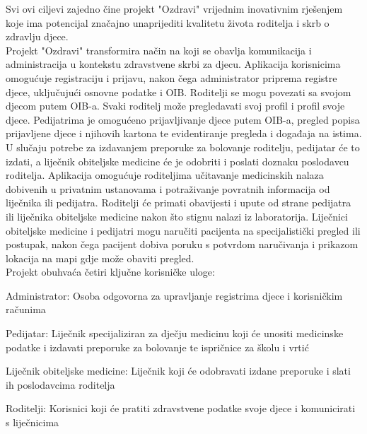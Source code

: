 Svi ovi ciljevi zajedno čine projekt "Ozdravi" vrijednim inovativnim rješenjem koje ima potencijal značajno unaprijediti kvalitetu života roditelja i skrb o zdravlju djece. \\

Projekt "Ozdravi" transformira način na koji se obavlja komunikacija i administracija u kontekstu zdravstvene skrbi za djecu. Aplikacija korisnicima omogućuje registraciju i prijavu, nakon čega administrator priprema registre djece, uključujući osnovne podatke i OIB. Roditelji se mogu povezati sa svojom djecom putem OIB-a. Svaki roditelj može pregledavati svoj profil i profil svoje djece. Pedijatrima je omogućeno prijavljivanje djece putem OIB-a, pregled popisa prijavljene djece i njihovih kartona te evidentiranje pregleda i događaja na istima. U slučaju potrebe za izdavanjem preporuke za bolovanje roditelju, pedijatar će to izdati, a liječnik obiteljske medicine će je odobriti i poslati doznaku poslodavcu roditelja. Aplikacija omogućuje roditeljima učitavanje medicinskih nalaza dobivenih u privatnim ustanovama i potraživanje povratnih informacija od liječnika ili pedijatra. Roditelji će primati obavijesti i upute od strane pedijatra ili liječnika obiteljske medicine nakon što stignu nalazi iz laboratorija. Liječnici obiteljske medicine i pedijatri mogu naručiti pacijenta na specijalistički pregled ili postupak, nakon čega pacijent dobiva poruku s potvrdom naručivanja i prikazom lokacija na mapi gdje može obaviti pregled.
\\

Projekt obuhvaća četiri ključne korisničke uloge:
\begin{packed_enum}
    \item Administrator: Osoba odgovorna za upravljanje registrima djece i korisničkim računima
    \item Pedijatar: Liječnik specijaliziran za dječju medicinu koji će unositi medicinske podatke i izdavati preporuke za bolovanje te ispričnice za školu i vrtić
    \item Liječnik obiteljske medicine: Liječnik koji će odobravati izdane preporuke i slati ih poslodavcima roditelja
    \item Roditelji: Korisnici koji će pratiti zdravstvene podatke svoje djece i komunicirati s liječnicima
\end{packed_enum}


